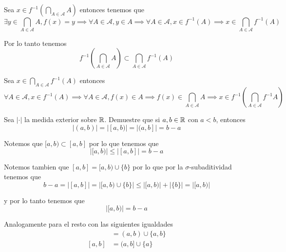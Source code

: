 \documentclass[../main.tex]{subfiles}
\begin{document}
\begin{solution}
  Sea $x \in f^{-1}(\bigcap_{A \in \mathcal{A}} A)$ entonces tenemos que
  \begin{equation*}
    \exists y \in \bigcap_{A \in \mathcal{A}} A, f(x) = y \implies \forall A \in \mathcal{A}, y \in A \implies \forall A \in \mathcal{A}, x \in f^{-1}(A) \implies x \in \bigcap_{A \in \mathcal{A}} f^{-1}(A)
  \end{equation*}

  Por lo tanto tenemos
  \begin{equation*}
    f^{-1}(\bigcap_{A \in \mathcal{A}} A) \subset \bigcap_{A \in \mathcal{A}} f^{-1}(A)
  \end{equation*}

  Sea $x \in \bigcap_{A \in \mathcal{A}} f^{-1}(A)$ entonces
  \begin{equation*}
    \forall A \in \mathcal{A}, x \in f^{-1}(A) \implies \forall A \in \mathcal{A} , f(x) \in A \implies f(x) \in \bigcap_{A \in \mathcal{A}} A \implies x \in f^{-1}(\bigcap_{A \in \mathcal{A}} f^{-1} A)
  \end{equation*}
\end{solution}

\begin{problem}
  Sea $|\cdot|$ la medida exterior sobre $\mathbb{R}$. Demuestre que si $a, b \in \mathbb{R}$ con $a < b$, entonces
  \begin{equation*}
    |(a, b)| = |[a, b)| = |(a, b]| = b - a
  \end{equation*}
\end{problem}
\begin{solution}
  Notemos que $[a, b) \subset [a, b]$ por lo que tenemos que
  \begin{equation*}
    |[a, b)| \leq |[a, b]| = b - a
  \end{equation*}

  Notemos tambien que $[a, b] = [a, b) \cup \{b\}$ por lo que por la $\sigma$-subaditividad tenemos que
  \begin{equation*}
    b - a = |[a, b]| = |[a, b) \cup \{b\}| \leq |[a, b)| + |\{b\}| = |[a, b)|
  \end{equation*}

  y por lo tanto tenemos que
  \begin{equation*}
    |[a, b)| = b - a
  \end{equation*}

  Analogamente para el resto con las siguientes igualdades
  \begin{align*}
    [a, b] &= (a, b) \cup \{a, b\}\\
    [a, b] &= (a, b] \cup \{a\}
  \end{align*}
\end{solution}
\end{document}
